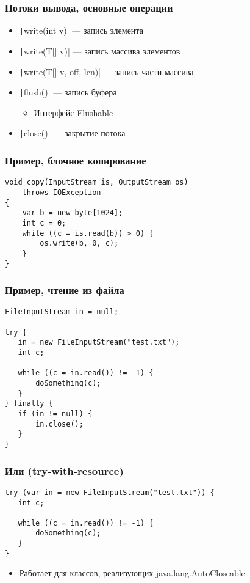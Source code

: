 \documentclass[xetex,mathserif,serif]{beamer}
\begin{document}
	\begin{frame}
		\frametitle{Потоки вывода, основные операции}
		\begin{itemize}
			\item \texttt|write(int v)| --- запись элемента
			\item \texttt|write(T[] v)| --- запись массива элементов
			\item \texttt|write(T[] v, off, len)| --- запись части массива
			\item \texttt|flush()| --- запись буфера
			\begin{itemize}
				\item Интерфейс Flushable
			\end{itemize}
			\item \texttt|close()| --- закрытие потока
		\end{itemize}
	\end{frame}

	\begin{frame}[fragile]
		\frametitle{Пример, блочное копирование}
		\begin{verbatim}
void copy(InputStream is, OutputStream os)
    throws IOException
{
    var b = new byte[1024];
    int c = 0;
    while ((c = is.read(b)) > 0) {
        os.write(b, 0, c);
    }
}
		\end{verbatim}
	\end{frame}

	\begin{frame}[fragile]
		\frametitle{Пример, чтение из файла}
		\begin{verbatim}
FileInputStream in = null;

try {
   in = new FileInputStream("test.txt");
   int c;

   while ((c = in.read()) != -1) {
       doSomething(c);
   }
} finally {
   if (in != null) {
       in.close();
   }
}
		\end{verbatim}
	\end{frame}

	\begin{frame}[fragile]
		\frametitle{Или (try-with-resource)}
		\begin{verbatim}
try (var in = new FileInputStream("test.txt")) {
   int c;

   while ((c = in.read()) != -1) {
       doSomething(c);
   }
}
		\end{verbatim}
		\begin{itemize}
			\item Работает для классов, реализующих java.lang.AutoCloseable
		\end{itemize}
	\end{frame}
\end{document}
